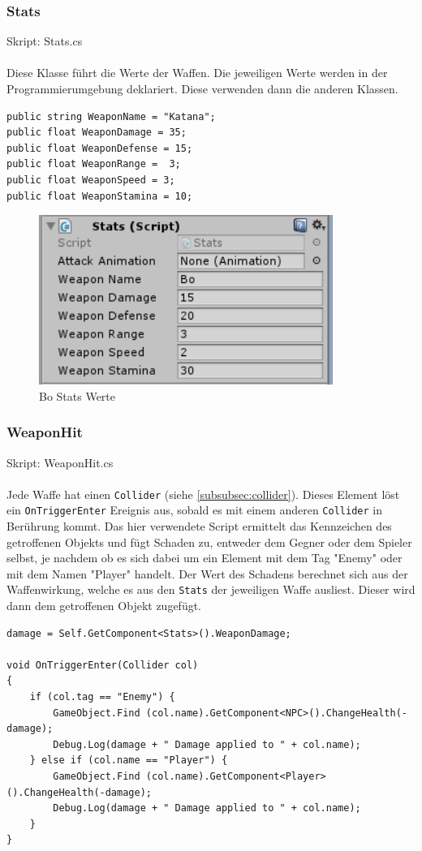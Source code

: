 \subsubsection{Stats}
Skript: Stats.cs\\\\
Diese Klasse führt die Werte der Waffen. Die jeweiligen Werte werden in der Programmierumgebung deklariert. Diese verwenden dann die anderen Klassen.

\begin{lstlisting}
public string WeaponName = "Katana";
public float WeaponDamage = 35;
public float WeaponDefense = 15;
public float WeaponRange =	3;
public float WeaponSpeed = 3;
public float WeaponStamina = 10;
\end{lstlisting}

\begin{figure}[H]
\includegraphics[scale=1]{screenshots/bostats.png}
\caption{Bo Stats Werte}
\end{figure}

\subsubsection{WeaponHit}
Skript: WeaponHit.cs\\\\
Jede Waffe hat einen \lstinline{Collider} (siehe \cref{subsubsec:collider}). Dieses Element löst ein \lstinline{OnTriggerEnter} Ereignis aus, sobald es mit einem anderen \lstinline{Collider} in Berührung kommt.
Das hier verwendete Script ermittelt das Kennzeichen des getroffenen Objekts und fügt Schaden zu, entweder dem Gegner oder dem Spieler selbst, je nachdem ob es sich dabei um ein Element mit dem Tag "Enemy" oder mit dem Namen "Player" handelt. %
Der Wert des Schadens berechnet sich aus der Waffenwirkung, welche es aus den \lstinline{Stats} der jeweiligen Waffe ausliest. Dieser wird dann dem getroffenen Objekt zugefügt.

\begin{lstlisting}[caption={Waffentreffer}]
damage = Self.GetComponent<Stats>().WeaponDamage;

void OnTriggerEnter(Collider col)
{
	if (col.tag == "Enemy") {
		GameObject.Find (col.name).GetComponent<NPC>().ChangeHealth(-damage);
		Debug.Log(damage + " Damage applied to " + col.name);
	} else if (col.name == "Player") {
		GameObject.Find (col.name).GetComponent<Player>().ChangeHealth(-damage);
		Debug.Log(damage + " Damage applied to " + col.name);
	}
}
\end{lstlisting}

